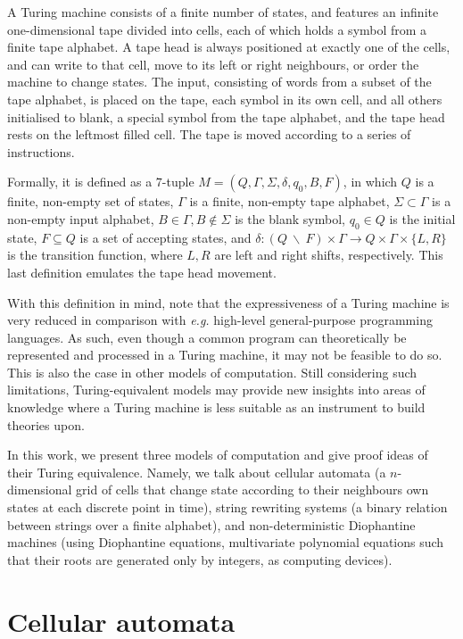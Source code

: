 \documentclass[12pt]{article}
\begin{document}
A Turing machine consists of a finite number of states, and features an infinite one-dimensional tape divided into cells, each of which holds a symbol from a finite tape alphabet. A tape head is always positioned at exactly one of the cells, and can write to that cell, move to its left or right neighbours, or order the machine to change states. The input, consisting of words from a subset of the tape alphabet, is placed on the tape, each symbol in its own cell, and all others initialised to blank, a special symbol from the tape alphabet, and the tape head rests on the leftmost filled cell. The tape is moved according to a series of instructions.

Formally, it is defined as a $7$-tuple $M = (Q, \Gamma, \Sigma, \delta, q_{0}, B, F)$, in which $Q$ is a finite, non-empty set of states, $\Gamma$ is a finite, non-empty tape alphabet, $\Sigma \subset \Gamma$ is a non-empty input alphabet, $B \in \Gamma, B \not\in \Sigma$ is the blank symbol, $q_{0} \in Q$ is the initial state, $F \subseteq Q$ is a set of accepting states, and $\delta : (Q \: \backslash \: F) \times \Gamma \rightarrow Q \times \Gamma \times \{L, R\}$ is the transition function, where $L, R$ are left and right shifts, respectively. This last definition emulates the tape head movement.

With this definition in mind, note that the expressiveness of a Turing machine is very reduced in comparison with \emph{e.g.} high-level general-purpose programming languages. As such, even though a common program can theoretically be represented and processed in a Turing machine, it may not be feasible to do so. This is also the case in other models of computation. Still considering such limitations, Turing-equivalent models may provide new insights into areas of knowledge where a Turing machine is less suitable as an instrument to build theories upon.

In this work, we present three models of computation and give proof ideas of their Turing equivalence. Namely, we talk about cellular automata (a $n$-dimensional grid of cells that change state according to their neighbours own states at each discrete point in time), string rewriting systems (a binary relation between strings over a finite alphabet), and non-deterministic Diophantine machines (using Diophantine equations, multivariate polynomial equations such that their roots are generated only by integers, as computing devices).

\section{Cellular automata}\label{sec:ca}
\end{document}

